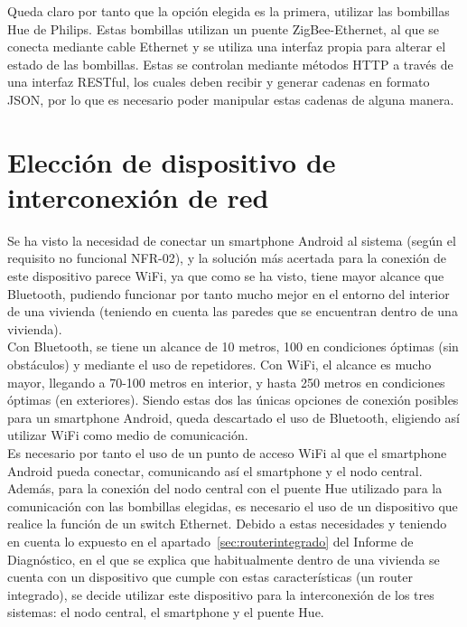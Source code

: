     Queda claro por tanto que la opción elegida es la primera, utilizar las bombillas Hue de Philips. Estas bombillas utilizan un puente ZigBee-Ethernet, al que se conecta mediante cable Ethernet y se utiliza una interfaz propia para alterar el estado de las bombillas. Estas se controlan mediante métodos HTTP a través de una interfaz RESTful, los cuales deben recibir y generar cadenas en formato JSON, por lo que es necesario poder manipular estas cadenas de alguna manera.

\section{Elección de dispositivo de interconexión de red}

    Se ha visto la necesidad de conectar un smartphone Android al sistema (según el requisito no funcional NFR-02), y la solución más acertada para la conexión de este dispositivo parece WiFi, ya que como se ha visto, tiene mayor alcance que Bluetooth, pudiendo funcionar por tanto mucho mejor en el entorno del interior de una vivienda (teniendo en cuenta las paredes que se encuentran dentro de una vivienda). \\

    Con Bluetooth, se tiene un alcance de 10 metros, 100 en condiciones óptimas (sin obstáculos) y mediante el uso de repetidores. Con WiFi, el alcance es mucho mayor, llegando a 70-100 metros en interior, y hasta 250 metros en condiciones óptimas (en exteriores). Siendo estas dos las únicas opciones de conexión posibles para un smartphone Android, queda descartado el uso de Bluetooth, eligiendo así utilizar WiFi como medio de comunicación. \\

    Es necesario por tanto el uso de un punto de acceso WiFi al que el smartphone Android pueda conectar, comunicando así el smartphone y el nodo central. Además, para la conexión del nodo central con el puente Hue utilizado para la comunicación con las bombillas elegidas, es necesario el uso de un dispositivo que realice la función de un switch Ethernet. Debido a estas necesidades y teniendo en cuenta lo expuesto en el apartado~\ref{sec:routerintegrado} del Informe de Diagnóstico, en el que se explica que habitualmente dentro de una vivienda se cuenta con un dispositivo que cumple con estas características (un router integrado)\cite{cisco_ccna}, se decide utilizar este dispositivo para la interconexión de los tres sistemas: el nodo central, el smartphone y el puente Hue.\\

